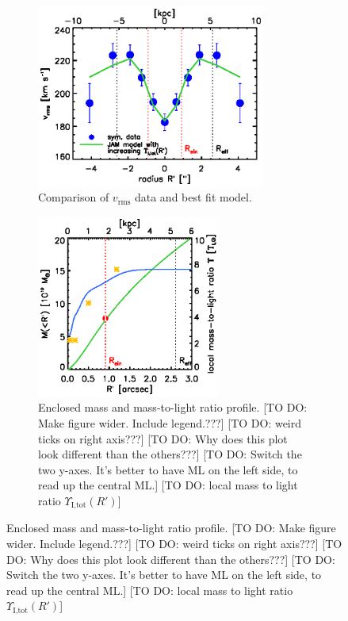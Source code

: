 
\begin{figure}
\centering
\begin{subfigure}{.5\textwidth}
  \centering
  \includegraphics[height=6cm]{fig/jam_G_vrms.ps}
  \caption{Comparison of $v_\text{rms}$ data and best fit model.}
  \label{fig:JAM_modelG}
\end{subfigure}%
\begin{subfigure}{.5\textwidth}
  \centering
  \includegraphics[height=6cm]{fig/jam_G_enclMass.ps}
  \caption{Enclosed mass and mass-to-light ratio profile. [TO DO: Make figure wider. Include legend.???] [TO DO: weird  ticks on right axis???] [TO DO: Why does this plot look different than the others???] [TO DO: Switch the two y-axes. It's better to have ML on the left side, to read up the central ML.] [TO DO: local mass to light ratio $\Upsilon_\text{I,tot}(R')$]}
  \label{fig:enclMass_modelG}
\end{subfigure}

\end{figure}
